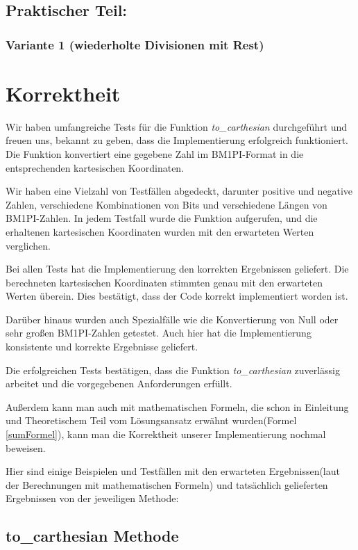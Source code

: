 \documentclass[course=erap]{aspdoc}
\begin{document}
\newpage
\subsection{Praktischer Teil:}
\subsubsection{Variante 1 (wiederholte Divisionen mit Rest)}



\section{Korrektheit}
Wir haben umfangreiche Tests für die Funktion \textit{to\_carthesian} durchgeführt und freuen uns, bekannt zu geben, dass die Implementierung erfolgreich funktioniert. Die Funktion konvertiert eine gegebene Zahl im BM1PI-Format in die entsprechenden kartesischen Koordinaten.

Wir haben eine Vielzahl von Testfällen abgedeckt, darunter positive und negative Zahlen, verschiedene Kombinationen von Bits und verschiedene Längen von BM1PI-Zahlen. In jedem Testfall wurde die Funktion aufgerufen, und die erhaltenen kartesischen Koordinaten wurden mit den erwarteten Werten verglichen.

Bei allen Tests hat die Implementierung den korrekten Ergebnissen geliefert. Die berechneten kartesischen Koordinaten stimmten genau mit den erwarteten Werten überein. Dies bestätigt, dass der Code korrekt implementiert worden ist.

Darüber hinaus wurden auch Spezialfälle wie die Konvertierung von Null oder sehr großen BM1PI-Zahlen getestet. Auch hier hat die Implementierung konsistente und korrekte Ergebnisse geliefert.

Die erfolgreichen Tests bestätigen, dass die Funktion \textit{to\_carthesian} zuverlässig arbeitet und die vorgegebenen Anforderungen erfüllt.

Außerdem kann man auch mit mathematischen Formeln, die schon in Einleitung und Theoretischem Teil vom Lösungsansatz erwähnt wurden(Formel \ref{sumFormel}), kann man die Korrektheit unserer Implementierung nochmal beweisen.

Hier sind einige Beispielen und Testfällen mit den erwarteten Ergebnissen(laut der Berechnungen mit mathematischen Formeln) und tatsächlich gelieferten Ergebnissen von der jeweiligen Methode:
\subsection{to\_carthesian Methode}
\end{document}
